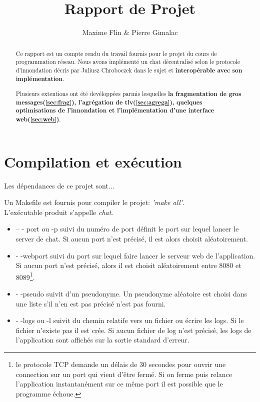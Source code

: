 \documentclass[a4paper,10pt]{article} %
\author{Maxime Flin \& Pierre Gimalac}
\title{Rapport de Projet}
\begin{document}
\maketitle

\begin{abstract}
  Ce rapport est un compte rendu du travail fournis pour le projet du cours de programmation réseau. Nous avons implémenté un chat décentralisé selon le protocole d'innondation décris par Juliusz Chroboczek dans le sujet et \textbf{interopérable avec son implémentation}.

  Plusieurs extentions ont été devéloppées parmis lesquelles \textbf{la fragmentation de gros messages(\ref{sec:frag}), l'agrégation de tlv(\ref{sec:agrega}), quelques optimisations de l'innondation et l'implémentation d'une interface web(\ref{sec:web})}.
\end{abstract}

\section{Compilation et exécution\label{sec:exec}}
Les dépendances de ce projet sont...

Un \textrm{Makefile} est fournis pour compiler le projet:  \textit{'make all'}.\\

L'exécutable produit s'appelle \textit{chat}.
\begin{itemize}
\item \textrm{-- - port} ou \textrm{-p} suivi du numéro de port définit le port sur lequel lancer le server de chat. Si aucun port n'est précisé, il est alors choisit aléatoirement.
\item \textrm{- -webport} suivi du port sur lequel faire lancer le serveur web de l'application. Si aucun port n'est précisé, alors il est choisit aléatoirement entre 8080 et 8089\footnote{le protocole TCP demande un délais de 30 secondes pour ouvrir une connection sur un port qui vient d'être fermé. Si on ferme puis relance l'application instantanément sur ce même port il est possible que le programme échoue.}.
\item \textrm{- -pseudo} suivit d'un pseudonyme. Un pseudonyme aléatoire est choisi dans une liste s'il n'en est pas précisé n'est pas fourni.
\item \textrm{- -logs} ou \textrm{-l} suivit du chemin relatife vers un fichier ou écrire les logs. Si le fichier n'existe pas il est crée. Si aucun fichier de log n'est précisé, les logs de l'application sont affichés sur la sortie standard d'erreur.
\end{itemize}
\end{document}
